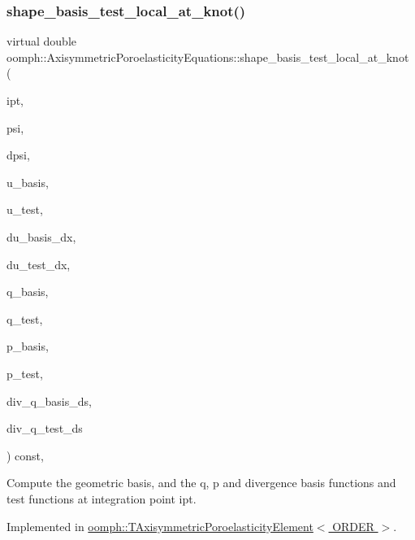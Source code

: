 \subsubsection{\texorpdfstring{shape\+\_\+basis\+\_\+test\+\_\+local\+\_\+at\+\_\+knot()}{shape\_basis\_test\_local\_at\_knot()}}
{\footnotesize\ttfamily virtual double oomph\+::\+Axisymmetric\+Poroelasticity\+Equations\+::shape\+\_\+basis\+\_\+test\+\_\+local\+\_\+at\+\_\+knot (\begin{DoxyParamCaption}\item[{const unsigned \&}]{ipt,  }\item[{\hyperlink{classoomph_1_1Shape}{Shape} \&}]{psi,  }\item[{\hyperlink{classoomph_1_1DShape}{D\+Shape} \&}]{dpsi,  }\item[{\hyperlink{classoomph_1_1Shape}{Shape} \&}]{u\+\_\+basis,  }\item[{\hyperlink{classoomph_1_1Shape}{Shape} \&}]{u\+\_\+test,  }\item[{\hyperlink{classoomph_1_1DShape}{D\+Shape} \&}]{du\+\_\+basis\+\_\+dx,  }\item[{\hyperlink{classoomph_1_1DShape}{D\+Shape} \&}]{du\+\_\+test\+\_\+dx,  }\item[{\hyperlink{classoomph_1_1Shape}{Shape} \&}]{q\+\_\+basis,  }\item[{\hyperlink{classoomph_1_1Shape}{Shape} \&}]{q\+\_\+test,  }\item[{\hyperlink{classoomph_1_1Shape}{Shape} \&}]{p\+\_\+basis,  }\item[{\hyperlink{classoomph_1_1Shape}{Shape} \&}]{p\+\_\+test,  }\item[{\hyperlink{classoomph_1_1Shape}{Shape} \&}]{div\+\_\+q\+\_\+basis\+\_\+ds,  }\item[{\hyperlink{classoomph_1_1Shape}{Shape} \&}]{div\+\_\+q\+\_\+test\+\_\+ds }\end{DoxyParamCaption}) const\hspace{0.3cm}{\ttfamily [protected]}, {}}



Compute the geometric basis, and the q, p and divergence basis functions and test functions at integration point ipt. 



Implemented in \hyperlink{classoomph_1_1TAxisymmetricPoroelasticityElement_acc7a872515a68044fd5f379ca683cab1}{oomph\+::\+T\+Axisymmetric\+Poroelasticity\+Element$<$ O\+R\+D\+E\+R $>$}.



